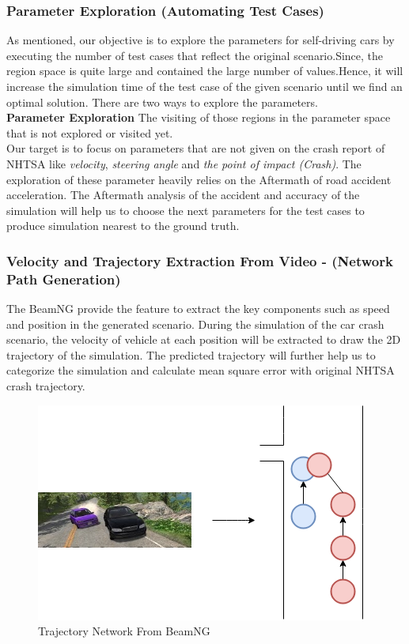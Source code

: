 \subsubsection{Parameter Exploration (Automating Test Cases)}
As mentioned, our objective is to explore the parameters for self-driving cars by executing the number of test cases that reflect the original scenario.Since, the region space is quite large and contained the large number of values.Hence, it will increase the simulation time of the test case of the given scenario until we find an optimal solution. There are two ways to explore the parameters.\\ 

\textbf{Parameter Exploration} The visiting of those regions in the parameter space that is not explored or visited yet.\\ 

Our target is to focus on parameters that are not given on the crash report of NHTSA like \textit{velocity}, \textit{steering angle} and \textit{the point of impact (Crash)}. The exploration of these parameter heavily relies on the Aftermath of road accident acceleration. The Aftermath analysis of the accident and accuracy of the simulation will help us to choose the next parameters for the test cases to produce simulation nearest to the ground truth. 

\subsubsection{Velocity and Trajectory Extraction From Video - (Network Path Generation)}
The BeamNG provide the feature to extract the key components such as speed and position in the generated scenario. During the simulation of the car crash scenario, the velocity of vehicle at each position will be extracted to draw the 2D trajectory of the simulation. The predicted trajectory will further help us to categorize the simulation and calculate mean square error with original NHTSA crash trajectory.  

\begin{figure}[H]
\centering
  \includegraphics[scale= 0.4]{pictures/SO1_Beam_Net.png}
  \caption{Trajectory Network From BeamNG}
\end{figure}

